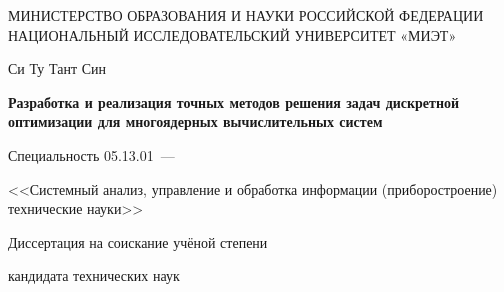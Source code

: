 \thispagestyle{empty}%
\begin{center}%
\MakeUppercase{Министерство образования и науки Российской Федерации}\\
\MakeUppercase{Национальный исследовательский университет «МИЭТ»}
\end{center}%
%
\vspace{0pt plus3fill} %
%
\vspace{0pt plus2fill} %
\begin{center}%
{\large Си Ту Тант Син}
\end{center}%
%
\vspace{0pt plus0fill} %
\begin{center}%
\textbf {\large Разработка и реализация точных методов решения задач дискретной оптимизации для многоядерных вычислительных систем}

\vspace{0pt plus2fill} %
{%
Специальность 05.13.01~--- 

<<Системный анализ, управление и обработка информации (приборостроение)
технические науки>>
}

\vspace{0pt plus2fill} %
Диссертация на соискание учёной степени

кандидата технических наук
\end{center}%
